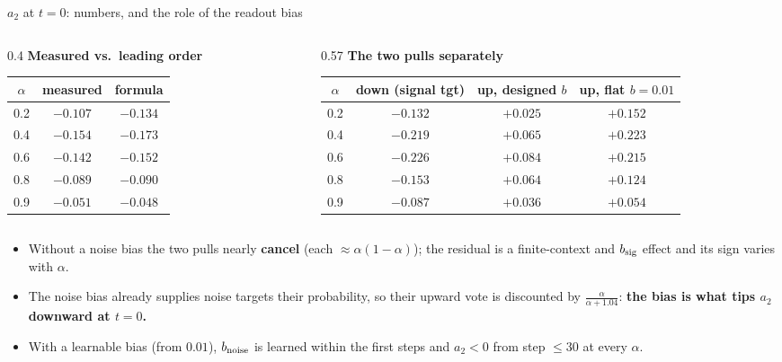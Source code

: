 \begin{frame}{$a_2$ at $t=0$: numbers, and the role of the readout bias}
\footnotesize
\begin{columns}[T]
\begin{column}{0.4\textwidth}
\textbf{Measured vs.\ leading order}
\begin{center}
\begin{tabular}{ccc}\toprule
$\alpha$ & measured & formula\\\midrule
0.2 & $-0.107$ & $-0.134$\\
0.4 & $-0.154$ & $-0.173$\\
0.6 & $-0.142$ & $-0.152$\\
0.8 & $-0.089$ & $-0.090$\\
0.9 & $-0.051$ & $-0.048$\\\bottomrule
\end{tabular}
\end{center}
\end{column}
\begin{column}{0.57\textwidth}
\textbf{The two pulls separately}
\begin{center}
\begin{tabular}{cccc}\toprule
$\alpha$ & down (signal tgt) & up, designed $b$ & up, flat $b=0.01$\\\midrule
0.2 & $-0.132$ & $+0.025$ & $+0.152$\\
0.4 & $-0.219$ & $+0.065$ & $+0.223$\\
0.6 & $-0.226$ & $+0.084$ & $+0.215$\\
0.8 & $-0.153$ & $+0.064$ & $+0.124$\\
0.9 & $-0.087$ & $+0.036$ & $+0.054$\\\bottomrule
\end{tabular}
\end{center}
\end{column}
\end{columns}
\vspace{0.5em}
\begin{itemize}
\item Without a noise bias the two pulls nearly \textbf{cancel} (each $\approx\alpha(1-\alpha)$); the residual is a finite-context
and $b_{\rm sig}$ effect and its sign varies with $\alpha$.
\item The noise bias already supplies noise targets their probability, so their upward vote is discounted by
$\frac{\alpha}{\alpha+1.04}$: \textbf{the bias is what tips $a_2$ downward at $t=0$.}
\item With a learnable bias (from $0.01$), $b_{\rm noise}$ is learned within the first steps and $a_2<0$ from step $\le30$ at every $\alpha$.
\end{itemize}
\end{frame}


